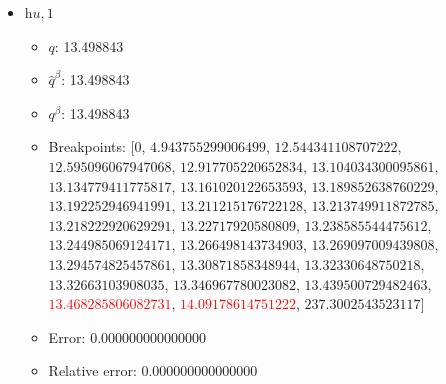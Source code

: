 \documentclass{article}%
\begin{document}
\begin{itemize}
\begin{itemize}
		\item Breakpoints: $[$$0$, $18.023935870161154$, $21.04660840930274$, $24.97364426355679$, $30.189424467922265$, $34.23465128608717$, $36.670233878040335$, $37.21616748032837$, $37.443498367229196$, $37.47875108132638$, $37.52720514437563$, $37.554741031910254$, $37.612770977560544$, $37.65435035996605$, $37.6551299822246$, $37.682669717644174$, $37.71812813120871$, $37.76995088018704$, $37.78573239590169$, $37.821651654621526$, $37.88148462263016$, $37.9018730666985$, $37.9454585315849$, $38.10872593446926$, \textcolor{red}{$38.21652191748154$}, \textcolor{red}{$38.88483572219945$}, $285.4001551947793$$]$%
		\item Error: 0.000000000000000%
		\item Relative error: 0.000000000000000%
	\end{itemize}%
	\item $\textit{hu},1$%
	\begin{itemize}%
		\item $q$: 13.498843%
		\item $\hat{q}^\beta$: 13.498843%
		\item $q^\beta$: 13.498843%
		\item Breakpoints: $[$$0$, $4.943755299006499$, $12.544341108707222$, $12.595096067947068$, $12.917705220652834$, $13.104034300095861$, $13.134779411775817$, $13.161020122653593$, $13.189852638760229$, $13.192252946941991$, $13.211215176722128$, $13.213749911872785$, $13.218222920629291$, $13.22717920580809$, $13.238585544475612$, $13.244985069124171$, $13.266498143734903$, $13.269097009439808$, $13.294574825457861$, $13.30871858348944$, $13.32330648750218$, $13.32663103908035$, $13.346967780023082$, $13.439500729482463$, \textcolor{red}{$13.468285806082731$}, \textcolor{red}{$14.09178614751222$}, $237.3002543523117$$]$%
		\item Error: 0.000000000000000%
		\item Relative error: 0.000000000000000%
	\end{itemize}%
\end{itemize}%
\end{document}
